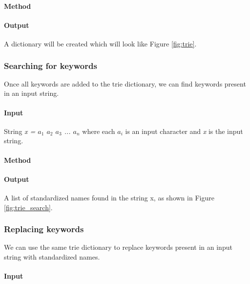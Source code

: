 \paragraph*{Method}\hfill\break


\paragraph*{Output}
A dictionary will be created which will look like Figure \ref{fig:trie}.

\subsubsection{Searching for keywords}
Once all keywords are added to the trie dictionary, we can find keywords present in an input string.

\paragraph*{Input}\hfill\break

\noindent String \textit{x = $a_1$ $a_2$ $a_3$ ... $a_n$} where each \textit{$a_i$} is an input character and \textit{x} is the input string.

\paragraph*{Method}\hfill\break


\paragraph*{Output}
A list of standardized names found in the string x, as shown in Figure \ref{fig:trie_search}.


\subsubsection{Replacing keywords}
We can use the same trie dictionary to replace keywords present in an input string with standardized names.

\paragraph*{Input}\hfill\break

